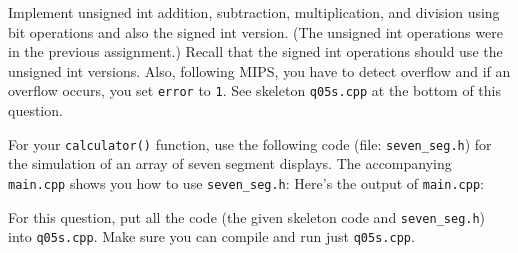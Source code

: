 Implement unsigned int addition, subtraction, multiplication, and division
using bit operations
and also the signed int version.
(The unsigned int operations were in the previous assignment.)
Recall that the signed int operations should use the
unsigned int versions.
Also, following MIPS, you have to detect overflow and if an overflow
occurs, you set \verb!error! to \verb!1!.
See skeleton \verb!q05s.cpp! at the bottom of this question.

For your \verb!calculator()! function, use the following code
(file: \verb!seven_seg.h!) for the
simulation of an array of seven segment displays.
The accompanying \verb!main.cpp! shows you how to use \verb!seven_seg.h!:
Here's the output of \verb!main.cpp!:

For this question, put all the code (the given skeleton code
and \verb!seven_seg.h!) into \verb!q05s.cpp!.
Make sure you can compile and run just \verb!q05s.cpp!.
